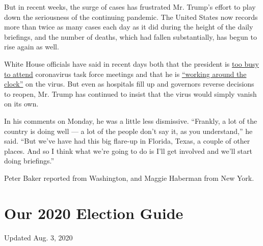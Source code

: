 But in recent weeks, the surge of cases has frustrated Mr. Trump's
effort to play down the seriousness of the continuing pandemic. The
United States now records more than twice as many cases each day as it
did during the height of the daily briefings, and the number of deaths,
which had fallen substantially, has begun to rise again as well.

White House officials have said in recent days both that the president
is
\href{https://www.washingtonpost.com/politics/trump-defends-bungled-handling-of-coronavirus-with-falsehoods-and-dubious-claims/2020/07/19/1b57cb3e-c9e6-11ea-91f1-28aca4d833a0_story.html}{too
busy to attend} coronavirus task force meetings and that he is
\href{https://www.nytimes.com/2020/07/19/us/politics/republicans-contradict-trump-coronavirus.html}{``working
around the clock''} on the virus. But even as hospitals fill up and
governors reverse decisions to reopen, Mr. Trump has continued to insist
that the virus would simply vanish on its own.

In his comments on Monday, he was a little less dismissive. ``Frankly, a
lot of the country is doing well --- a lot of the people don't say it,
as you understand,'' he said. ``But we've have had this big flare-up in
Florida, Texas, a couple of other places. And so I think what we're
going to do is I'll get involved and we'll start doing briefings.''

Peter Baker reported from Washington, and Maggie Haberman from New York.

\hypertarget{our-2020-election-guide}{%
\section{Our 2020 Election Guide}\label{our-2020-election-guide}}

Updated Aug. 3, 2020


